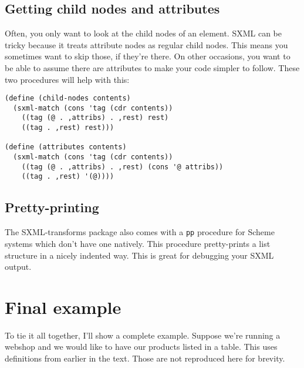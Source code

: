 \documentclass{article}
\begin{document}
\subsection{Getting child nodes and attributes}

Often, you only want to look at the child nodes of an element.  SXML
can be tricky because it treats attribute nodes as regular child
nodes.  This means you sometimes want to skip those, if they're there.
On other occasions, you want to be able to assume there are
attributes to make your code simpler to follow.  These two procedures
will help with this:

\begin{verbatim}
(define (child-nodes contents)
  (sxml-match (cons 'tag (cdr contents))
    ((tag (@ . ,attribs) . ,rest) rest)
    ((tag . ,rest) rest)))

(define (attributes contents)
  (sxml-match (cons 'tag (cdr contents))
    ((tag (@ . ,attribs) . ,rest) (cons '@ attribs))
    ((tag . ,rest) '(@))))
\end{verbatim}


\subsection{Pretty-printing}

The SXML-transforms package also comes with a \verb|pp| procedure for
Scheme systems which don't have one natively.  This procedure
pretty-prints a list structure in a nicely indented way.  This is
great for debugging your SXML output.


\section{Final example}

To tie it all together, I'll show a complete example.  Suppose we're
running a webshop and we would like to have our products listed in a
table.  This uses definitions from earlier in the text.  Those are not
reproduced here for brevity.
\end{document}
